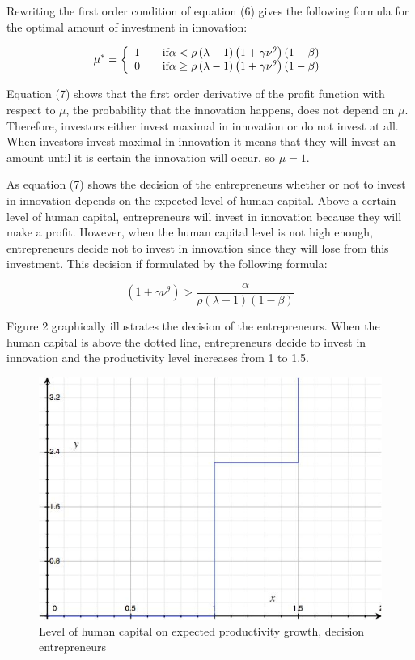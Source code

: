 \documentclass[a4paper,11pt]{article} %
\begin{document}
Rewriting the first order condition of equation (6) gives the following formula for the optimal amount of investment in innovation:

\begin{equation}
\mu^* = \left\{\begin{array}{l l}
  1 & \quad \mbox{if} \alpha<\rho \left(\lambda-1\right) \left(1+\gamma\nu^{\theta}\right) \left(1-\beta\right) \\
  0 & \quad \mbox{if} \alpha \ge \rho \left(\lambda-1\right) \left(1+\gamma\nu^{\theta}\right) \left(1-\beta\right) \\ \end{array} \right.
\end{equation}

Equation (7) shows that the first order derivative of the profit function with respect to \(\mu\), the probability that the innovation happens, does not depend on \(\mu\). Therefore, investors either invest maximal in innovation or do not invest at all. When investors invest maximal in innovation it means that they will invest an amount until it is certain the innovation will occur, so \(\mu=1\).

As equation (7) shows the decision of the entrepreneurs whether or not to invest in innovation depends on the expected level of human capital. Above a certain level of human capital, entrepreneurs will invest in innovation because they will make a profit. However, when the human capital level is not high enough, entrepreneurs decide not to invest in innovation since they will lose from this investment. This decision if formulated by the following formula:

\begin{equation}
  \left( 1+\gamma\nu^{\theta} \right) > \frac{\alpha}{\rho \left(\lambda-1\right) \left(1-\beta\right)}
\end{equation}

Figure 2 graphically illustrates the decision of the entrepreneurs. When the human capital is above the dotted line, entrepreneurs decide to invest in innovation and the productivity level increases from 1 to 1.5. 

\begin{figure}
  \centering
  \includegraphics{figure2.png}
  \caption{Level of human capital on expected productivity growth, decision entrepreneurs}
\end{figure}
\end{document}
